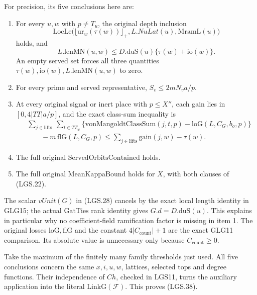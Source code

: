 \documentclass[11pt,a4paper]{article}
\numberwithin{equation}{section}
\theoremstyle{remark}\newtheorem{remark}[theorem]{Remark}
\begin{document}
For precision, its five conclusions here are:
\begin{enumerate}
\item For every \(u,w\) with \(p\ne T_u\), the original
depth inclusion
\[
 \mathrm{LocLe}\bigl(\lfloor\mathrm{ur}_w(\tau(w))\rfloor_+,
                          L.NuLat(u),\mathrm{MramL}(u)\bigr)
 \]
holds, and
\[
 L.\mathrm{lenMN}(u,w)
       \le D.\mathrm{duS}(u)\{\tau(w)+\mathrm{io}(w)\}.
 \]
An empty served set forces all three quantities
\(\tau(w),\mathrm{io}(w),L.\mathrm{lenMN}(u,w)\) to zero.
\item For every prime and served representative,
\(S_v\le2mN_va/p\).
\item At every original signal or inert place with
\(p\le X''\), each gain lies in
\([0,4|TT|a/p]\), and the exact class-sum inequality is
\[
 \begin{aligned}
 &\sum_{j\in\mathrm{lifts}}\ \sum_{t\in TT_w}
       \{\mathrm{vonMangoldtClassSum}(j,t,p)
                         -\mathrm{loG}(L,C_G,b_o,p)\}\\
 &\qquad-m\,\mathrm{flG}(L,C_G,p)
       \le\sum_{j\in\mathrm{lifts}}\mathrm{gain}(j,w)-\tau(w).
 \end{aligned}
 \]
\item The full original \(\mathrm{ServedOrbitsContained}\)
holds.
\item The full original \(\mathrm{MeanKappaBound}\)
holds for \(X\), with both clauses of (LGS.22).
\end{enumerate}
The scalar \(vUnit(G)\) in (LGS.28) cancels by the
exact local length identity in GLG15; the actual
\(\mathrm{GatTies}\) rank identity gives
\(G.d=D.\mathrm{duS}(u)\).
This explains in particular why no coefficient-field
ramification factor is missing in item 1.
The original losses \(\mathrm{loG},\mathrm{flG}\)
and the constant \(4|C_{\mathrm{count}}|+1\) are
the exact GLG11 comparison.  Its absolute value is
unnecessary only because \(C_{\mathrm{count}}\ge0\).

Take the maximum of the finitely many family thresholds
just used.  All five conclusions concern the same
\(x,i,u,w\), lattices, selected tops and degree functions.
Their independence of \(Ch\), checked in LGS11,
turns the auxiliary application into the literal
\(\mathrm{LinkG}(\mathcal F)\).  This proves (LGS.38).
\end{document}
